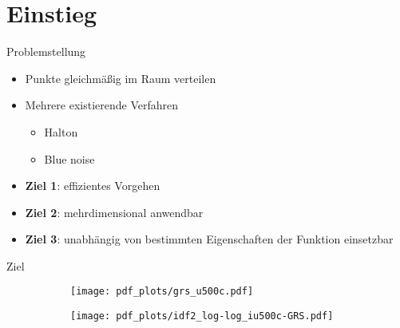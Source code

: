 \section{Einstieg}

\begin{frame}{Problemstellung}
	\begin{itemize}
		\item Punkte gleichmäßig im Raum verteilen
		\item Mehrere existierende Verfahren
		\begin{itemize}
			\item Halton
			\item Blue noise
		\end{itemize}
		\item \textbf{Ziel 1}: effizientes Vorgehen 
		\item \textbf{Ziel 2}: mehrdimensional anwendbar
		\item \textbf{Ziel 3}: unabhängig von bestimmten Eigenschaften der Funktion einsetzbar
	\end{itemize}
\end{frame}

\begin{frame}{Ziel}
	\begin{figure}
		\begin{subfigure}{.45\textwidth}
			\centering
			\texttt{[image: pdf\_plots/grs\_u500c.pdf]}
		\end{subfigure}
		\begin{subfigure}{.45\textwidth}
			\centering
			\texttt{[image: pdf\_plots/idf2\_log-log\_iu500c-GRS.pdf]}
		\end{subfigure}
	\end{figure}
\end{frame}